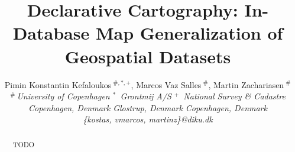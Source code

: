 \documentclass[10pt,conference,letterpaper]{IEEEtran}
\title{Declarative Cartography: In-Database Map Generalization of Geospatial Datasets}
\author{
{Pimin Konstantin Kefaloukos{\small $~^{\#,*,+}$}, Marcos Vaz Salles{\small $~^{\#}$}, Martin Zachariasen{\small $~^{\#}$} }%
\vspace{1.6mm}\\
\fontsize{10}{10}\selectfont\itshape
$^{\#}$\,University of Copenhagen \hspace{6ex} $^{*}$\ Grontmij A/S \hspace{6ex} $^{+}$\ National Survey \& Cadastre\\
Copenhagen, Denmark \hspace{5ex} Glostrup, Denmark \hspace{6ex} Copenhagen, Denmark\\
\fontsize{9}{9}\selectfont\ttfamily\upshape
\{kostas, vmarcos, martinz\}@diku.dk
}
\begin{document}
\maketitle

\begin{abstract}
TODO
\end{abstract}






















\end{document}
